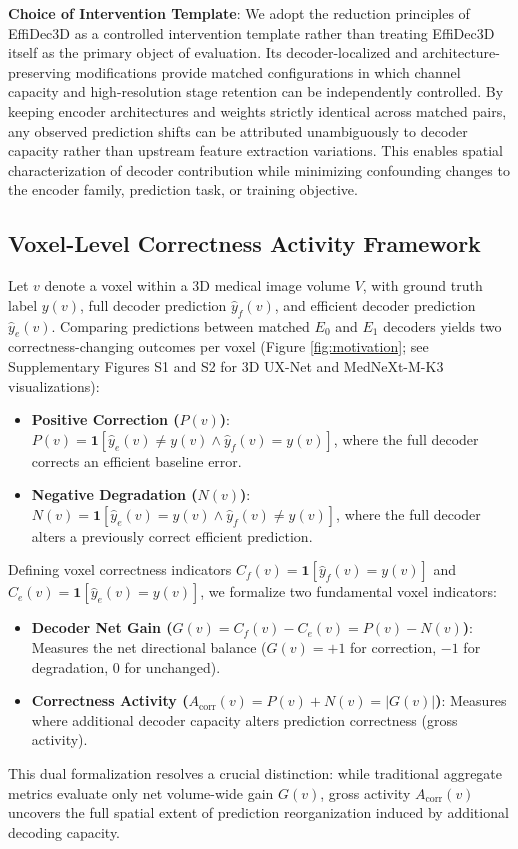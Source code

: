 \textbf{Choice of Intervention Template}: We adopt the reduction principles of EffiDec3D as a controlled intervention template rather than treating EffiDec3D itself as the primary object of evaluation. Its decoder-localized and architecture-preserving modifications provide matched configurations in which channel capacity and high-resolution stage retention can be independently controlled. By keeping encoder architectures and weights strictly identical across matched pairs, any observed prediction shifts can be attributed unambiguously to decoder capacity rather than upstream feature extraction variations. This enables spatial characterization of decoder contribution while minimizing confounding changes to the encoder family, prediction task, or training objective.

\subsection{Voxel-Level Correctness Activity Framework}
\label{sec:framework}

Let $v$ denote a voxel within a 3D medical image volume $V$, with ground truth label $y(v)$, full decoder prediction $\hat{y}_f(v)$, and efficient decoder prediction $\hat{y}_e(v)$. Comparing predictions between matched $E_0$ and $E_1$ decoders yields two correctness-changing outcomes per voxel (Figure \ref{fig:motivation}; see Supplementary Figures S1 and S2 for 3D UX-Net and MedNeXt-M-K3 visualizations):
\begin{itemize}
    \item \textbf{Positive Correction ($P(v)$)}: $P(v) = \mathbf{1}[\hat{y}_e(v) \neq y(v) \wedge \hat{y}_f(v) = y(v)]$, where the full decoder corrects an efficient baseline error.
    \item \textbf{Negative Degradation ($N(v)$)}: $N(v) = \mathbf{1}[\hat{y}_e(v) = y(v) \wedge \hat{y}_f(v) \neq y(v)]$, where the full decoder alters a previously correct efficient prediction.
\end{itemize}

Defining voxel correctness indicators $C_f(v) = \mathbf{1}[\hat{y}_f(v) = y(v)]$ and $C_e(v) = \mathbf{1}[\hat{y}_e(v) = y(v)]$, we formalize two fundamental voxel indicators:
\begin{itemize}
    \item \textbf{Decoder Net Gain ($G(v) = C_f(v) - C_e(v) = P(v) - N(v)$)}: Measures the net directional balance ($G(v) = +1$ for correction, $-1$ for degradation, $0$ for unchanged).
    \item \textbf{Correctness Activity ($A_{\text{corr}}(v) = P(v) + N(v) = |G(v)|$)}: Measures where additional decoder capacity alters prediction correctness (gross activity).
\end{itemize}
This dual formalization resolves a crucial distinction: while traditional aggregate metrics evaluate only net volume-wide gain $G(v)$, gross activity $A_{\text{corr}}(v)$ uncovers the full spatial extent of prediction reorganization induced by additional decoding capacity.

